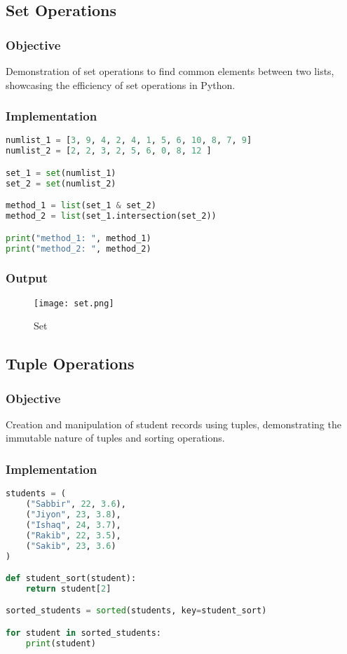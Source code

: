 \documentclass[12pt]{article}
\begin{document}
\subsection{Set Operations\hfill\href{https://github.com/sabbirahmed404/Python-Practice/blob/main/set.py}{\faGithub}}
\subsubsection{Objective}
Demonstration of set operations to find common elements between two lists, showcasing the efficiency of set operations in Python.

\subsubsection{Implementation}
\begin{lstlisting}[language=Python, caption=Set Operations Implementation]
numlist_1 = [3, 9, 4, 2, 4, 1, 5, 6, 10, 8, 7, 9]
numlist_2 = [2, 2, 3, 2, 5, 6, 0, 8, 12 ]

set_1 = set(numlist_1)
set_2 = set(numlist_2)

method_1 = list(set_1 & set_2)
method_2 = list(set_1.intersection(set_2))

print("method_1: ", method_1)
print("method_2: ", method_2)
\end{lstlisting}
\newpage

\subsubsection{Output}
\begin{figure}[h]
    \centering
    \texttt{[image: set.png]}
    \caption{Set}
    \label{fig:enter-label}
\end{figure}

\subsection{Tuple Operations\hfill\href{https://github.com/sabbirahmed404/Python-Practice/blob/main/tuple.py}{\faGithub}}
\subsubsection{Objective}
Creation and manipulation of student records using tuples, demonstrating the immutable nature of tuples and sorting operations.

\subsubsection{Implementation}
\begin{lstlisting}[language=Python, caption=Tuple Operations Implementation]
students = (
    ("Sabbir", 22, 3.6),
    ("Jiyon", 23, 3.8),
    ("Ishaq", 24, 3.7),
    ("Rakib", 22, 3.5),
    ("Sakib", 23, 3.6)
)

def student_sort(student):
    return student[2]

sorted_students = sorted(students, key=student_sort)

for student in sorted_students:
    print(student)

\end{lstlisting}
\newpage
\end{document}
